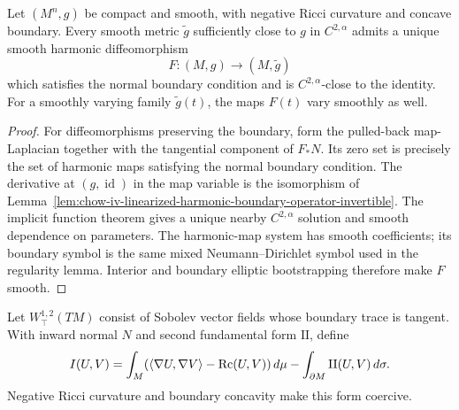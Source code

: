 \begin{proposition}
\label{prop:chow-iv-harmonic-diffeomorphism-negative-ricci}


Let \((M^n,g)\) be compact and smooth, with negative Ricci curvature and
concave boundary.  Every smooth metric \(\widetilde g\) sufficiently close to
\(g\) in \(C^{2,\alpha}\) admits a unique smooth harmonic diffeomorphism
\[
 F:(M,g)\longrightarrow(M,\widetilde g)
\]
which satisfies the normal boundary condition and is \(C^{2,\alpha}\)-close to
the identity.  For a smoothly varying family \(\widetilde g(t)\), the maps
\(F(t)\) vary smoothly as well.
\end{proposition}
\begin{proof}
\sketch
For diffeomorphisms preserving the boundary, form the pulled-back
map-Laplacian together with the tangential component of \(F_*N\).  Its zero set
is precisely the set of harmonic maps satisfying the normal boundary
condition.  The derivative at \((g,\operatorname{id})\) in the map variable is
the isomorphism of Lemma~\ref{lem:chow-iv-linearized-harmonic-boundary-operator-invertible}.
The implicit function theorem gives a unique nearby \(C^{2,\alpha}\) solution
and smooth dependence on parameters.  The harmonic-map system has smooth
coefficients; its boundary symbol is the same mixed Neumann--Dirichlet symbol
used in the regularity lemma.  Interior and boundary elliptic bootstrapping
therefore make \(F\) smooth.
\end{proof}

Let \(W^{1,2}_{\top}(TM)\) consist of Sobolev vector fields whose boundary
trace is tangent.  With inward normal \(N\) and second fundamental form
\(\mathrm{II}\), define
\[
 I(U,V)=\int_M(\langle\nabla U,\nabla V\rangle-\operatorname{Rc}(U,V))\,d\mu
 -\int_{\partial M}\mathrm{II}(U,V)\,d\sigma.
\]
Negative Ricci curvature and boundary concavity make this form coercive.

